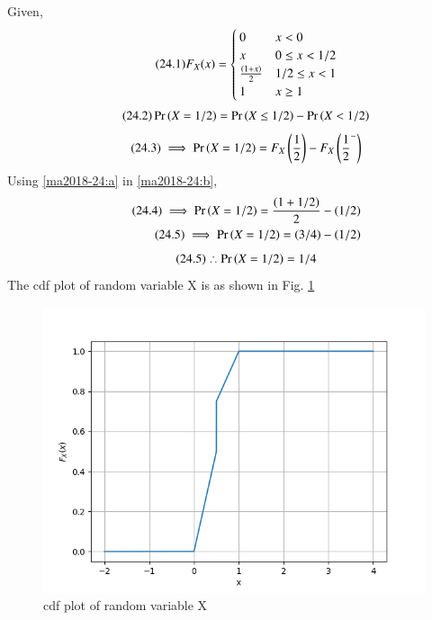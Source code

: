 
Given,
\begin{align}
\tag{24.1}
    F_{X}(x)=\begin{cases} 
            0  &  x<0\\
            x &  0 \le x <1/2\\
            \frac{\brak{1+x}}{2} &  1/2 \le x <1\\
            1  &  x\ge 1
            \end{cases} \label{ma2018-24:a}
\end{align}
\begin{align}
\tag{24.2}
    \Pr\left(X=1/2\right)=\Pr\left(X\leq 1/2\right)-\Pr\left(X<1/2\right) 
\end{align}
\begin{align}
\tag{24.3}
    \implies \pr{X=1/2}=F_{X}\brak{\frac{1}{2}}-F_{X}\brak{\frac{1}{2}^-} \label{ma2018-24:b}
\end{align}
 Using \eqref{ma2018-24:a} in \eqref{ma2018-24:b},
\begin{align}
\tag{24.4}
    \implies \Pr\left(X=1/2\right)=\frac{\left(1+1/2\right)}{2}-\left(1/2\right)\\
\tag{24.5}
    \implies \Pr\left(X=1/2\right)=\left(3/4\right)-\left(1/2\right)
\end{align}
\begin{align}
\tag{24.5}
    \therefore \Pr\left(X=1/2\right)=1/4
\end{align}
The cdf plot of random variable X is as shown in Fig. \ref{ma2018-24:cdf_plot}\\
\begin{figure}[t!]
    \centering
    \includegraphics[width=\columnwidth]{solutions/adv/ma/2018/24/cdf_plot.png}
    \caption{cdf plot of random variable X}
    \label{ma2018-24:cdf_plot}
\end{figure}
